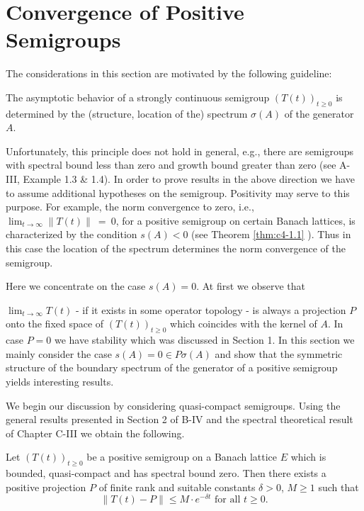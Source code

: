 \section{Convergence of Positive Semigroups}\label{sec:c4-2}
\hspace{1cm}{\Large by Günther Greiner und Rainer Nagel}
\vspace{.5cm}
\newline
The considerations in this section are motivated by the following guideline:

\begin{flushleft} 
\addtolength{\leftskip}{1cm}
\addtolength{\rightskip}{1cm}
The asymptotic behavior of a strongly continuous semigroup $(T(t))_{t \geq 0}$ is determined by the (structure, location of the) spectrum $\sigma(A)$ of the generator $A$.
\end{flushleft}

Unfortunately, this principle does not hold in general, e.g., there are semigroups with spectral bound less than zero and growth bound greater than zero (see A-III, Example 1.3 \& 1.4).
In order to prove results in the above direction we have to assume additional hypotheses on the semigroup.
Positivity may serve to this purpose.
For example, the norm convergence to zero, i.e., $\lim_{t \to \infty} \|T(t)\|~=~0$, for a positive semigroup on certain Banach lattices, is characterized by the condition $s(A) < 0$ (see Theorem \ref{thm:c4-1.1} ).
Thus in this case the location of the spectrum determines the norm convergence of the semigroup.

Here we concentrate on the case $s(A) = 0$.
At first we observe that


$\lim_{t \to \infty} T(t)$ - if it exists in some operator topology - is always a projection $P$ onto the fixed space of $(T(t))_{t \geq 0}$ which coincides with the kernel of $A$.
In case $P = 0$ we have stability which was discussed in Section 1.
In this section we mainly consider the case $s(A) = 0 \in P{\sigma}(A)$ and show that the symmetric structure of the boundary spectrum of the generator of a positive semigroup yields interesting results.

We begin our discussion by considering quasi-compact semigroups.
Using the general results presented in Section 2 of B-IV and the spectral theoretical result of Chapter C-III we obtain the following.

\begin{theorem}\label{thm:c4-2.1}
Let $(T(t))_{t \geq 0}$ be a positive semigroup on a Banach lattice $E$ which is bounded, quasi-compact and has spectral bound zero.
Then there exists a positive projection $P$ of finite rank and suitable constants $\delta > 0$, $M \geq 1$ such that
\begin{equation}\label{eq:c4-2.1}
\|T(t) - P\| \leq M \cdot e^{-\delta t} \text{ for all } t \geq 0.
\end{equation}
\end{theorem}

